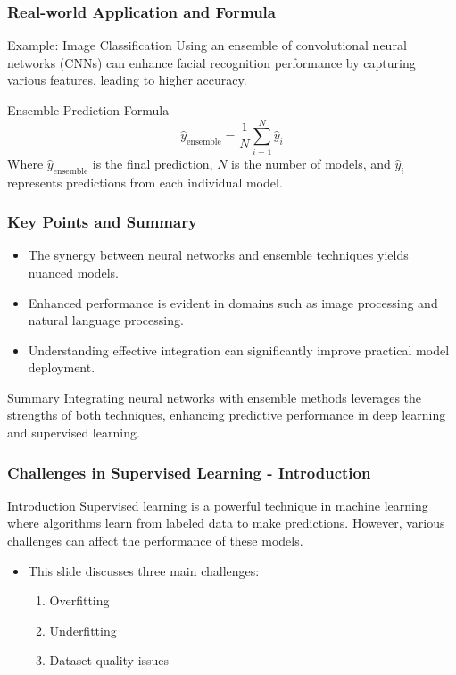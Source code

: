 \documentclass[aspectratio=169]{beamer}
\begin{document}
\begin{frame}[fragile]
    \frametitle{Real-world Application and Formula}
    \begin{block}{Example: Image Classification}
        Using an ensemble of convolutional neural networks (CNNs) can enhance facial recognition performance by capturing various features, leading to higher accuracy.
    \end{block}
    
    \begin{block}{Ensemble Prediction Formula}
        \begin{equation}
            \hat{y}_{\text{ensemble}} = \frac{1}{N} \sum_{i=1}^{N} \hat{y}_i
        \end{equation}
        Where \( \hat{y}_{\text{ensemble}} \) is the final prediction, \( N \) is the number of models, and \( \hat{y}_i \) represents predictions from each individual model.
    \end{block}
\end{frame}

\begin{frame}[fragile]
    \frametitle{Key Points and Summary}
    \begin{itemize}
        \item The synergy between neural networks and ensemble techniques yields nuanced models.
        \item Enhanced performance is evident in domains such as image processing and natural language processing.
        \item Understanding effective integration can significantly improve practical model deployment.
    \end{itemize}

    \begin{block}{Summary}
        Integrating neural networks with ensemble methods leverages the strengths of both techniques, enhancing predictive performance in deep learning and supervised learning.
    \end{block}
\end{frame}

\begin{frame}[fragile]
    \frametitle{Challenges in Supervised Learning - Introduction}
    \begin{block}{Introduction}
        Supervised learning is a powerful technique in machine learning where algorithms learn from labeled data to make predictions. 
        However, various challenges can affect the performance of these models.
    \end{block}
    \begin{itemize}
        \item This slide discusses three main challenges:
        \begin{enumerate}
            \item Overfitting
            \item Underfitting
            \item Dataset quality issues
        \end{enumerate}
    \end{itemize}
\end{frame}
\end{document}
